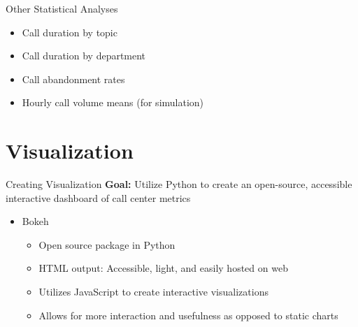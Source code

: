 \documentclass{beamer}
\begin{document}
\begin{frame}{Other Statistical Analyses}
    \begin{itemize}
        \item Call duration by topic
        \item Call duration by department
        \item Call abandonment rates
        \item Hourly call volume means (for simulation)
\end{itemize}

\end{frame}




    
\section{Visualization}


\begin{frame}{Creating Visualization}
   \textbf{Goal: }Utilize Python to create an open-source, accessible interactive dashboard of call center metrics
\begin{itemize}
	\item Bokeh
	\begin{itemize}
		\item Open source package in Python
		\item HTML output:  Accessible, light, and easily hosted on web
	\item Utilizes JavaScript to create interactive visualizations
		\item Allows for more interaction and usefulness as opposed to static charts
		\end{itemize}
\end{itemize}
    
    
    
\end{frame}
\end{document}
